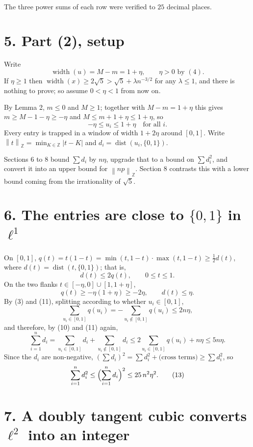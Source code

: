 \documentclass[12pt]{article}
\newcommand{\sumi}{\sum_{i=1}^{n}}
\newcommand{\W}{\operatorname{width}}
\newcommand{\dist}{\operatorname{dist}}
\newcommand{\ZZ}{\mathbb Z}
\newcommand{\normZ}[1]{\left\lVert #1\right\rVert_{\ZZ}}
\begin{document}
The three power sums of each row were verified to \(25\) decimal places.

\section*{5. Part (2), setup}

Write
\[
\W(u)=M-m=1+\eta,
\qquad \eta>0 \text{ by } (4).
\]
If \(\eta\ge1\) then \(\W(x)\ge2\sqrt5>\sqrt5+\lambda n^{-3/2}\) for any
\(\lambda\le1\), and there is nothing to prove; so assume
\(0<\eta<1\) from now on.

By Lemma 2, \(m\le0\) and \(M\ge1\); together with \(M-m=1+\eta\) this
gives \(m\ge M-1-\eta\ge-\eta\) and \(M\le m+1+\eta\le1+\eta\), so
\[
\boxed{\displaystyle -\eta\le u_i\le1+\eta\quad\text{for all }i.}
\tag{9}
\]
Every entry is trapped in a window of width \(1+2\eta\) around
\([0,1]\). Write \(\normZ{t}=\min_{K\in\ZZ}|t-K|\) and
\(d_i=\dist(u_i,\{0,1\})\).

Sections 6 to 8 bound \(\sum d_i\) by \(n\eta\), upgrade that to a bound
on \(\sum d_i^2\), and convert it into an upper bound for \(\normZ{np}\).
Section 8 contrasts this with a lower bound coming from the irrationality
of \(\sqrt5\).

\section*{6. The entries are close to \(\{0,1\}\) in \(\ell^1\)}

On \([0,1]\), \(q(t)=t(1-t)=\min(t,1-t)\cdot\max(t,1-t)\ge\frac12 d(t)\),
where \(d(t)=\dist(t,\{0,1\})\); that is,
\[
d(t)\le2q(t),\qquad 0\le t\le1 .
\tag{10}
\]
On the two flanks \(t\in[-\eta,0]\cup[1,1+\eta]\),
\[
q(t)\ge-\eta(1+\eta)\ge-2\eta,
\qquad
d(t)\le\eta .
\tag{11}
\]
By (3) and (11), splitting according to whether \(u_i\in[0,1]\),
\[
\sum_{u_i\in[0,1]}q(u_i)
=-\sum_{u_i\notin[0,1]}q(u_i)
\le 2n\eta ,
\]
and therefore, by (10) and (11) again,
\[
\sumi d_i
=\sum_{u_i\in[0,1]}d_i+\sum_{u_i\notin[0,1]}d_i
\le 2\sum_{u_i\in[0,1]}q(u_i)+n\eta
\le5n\eta .
\tag{12}
\]
Since the \(d_i\) are non-negative,
\((\sum d_i)^2=\sum d_i^2+\text{(cross terms)}\ge\sum d_i^2\), so
\[
\sumi d_i^2\le\Bigl(\sumi d_i\Bigr)^2\le25\,n^2\eta^2 .
\tag{13}
\]

\section*{7. A doubly tangent cubic converts \(\ell^2\) into an integer}
\end{document}
